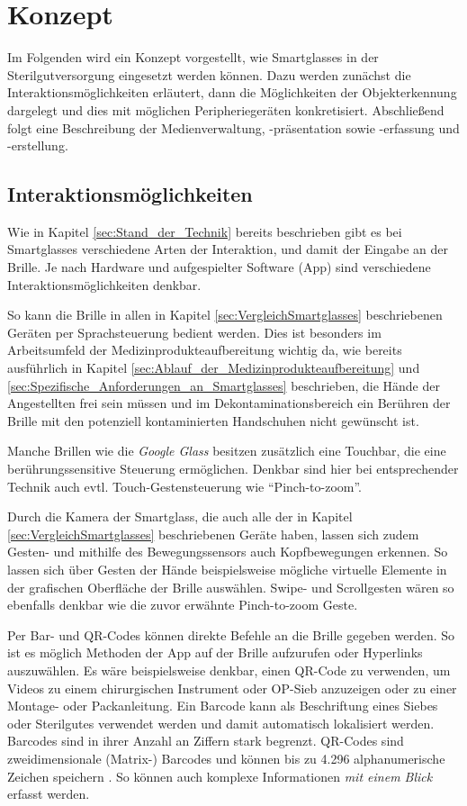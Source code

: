 %
%
%
%
%
%
\chapter{Konzept}
\label{ch:Konzept}
Im Folgenden wird ein Konzept vorgestellt, wie Smartglasses in der Sterilgutversorgung eingesetzt werden können. Dazu werden zunächst die Interaktionsmöglichkeiten erläutert, dann die Möglichkeiten der Objekterkennung dargelegt und dies mit möglichen Peripheriegeräten konkretisiert. Abschließend folgt eine Beschreibung der Medienverwaltung, -präsentation sowie -erfassung und -erstellung.
%
%
%
%
%
%
\section{Interaktionsmöglichkeiten}
\label{sec:Interaktionsmoeglichkeiten}
Wie in Kapitel \ref{sec:Stand_der_Technik} bereits beschrieben gibt es bei Smartglasses verschiedene Arten der Interaktion, und damit der Eingabe an der Brille. Je nach Hardware und aufgespielter Software (App) sind verschiedene Interaktionsmöglichkeiten denkbar. 

So kann die Brille in allen in Kapitel \ref{sec:VergleichSmartglasses} beschriebenen Geräten per Sprachsteuerung bedient werden. Dies ist besonders im Arbeitsumfeld der Medizinprodukteaufbereitung wichtig da, wie bereits ausführlich in Kapitel \ref{sec:Ablauf_der_Medizinprodukteaufbereitung} und \ref{sec:Spezifische_Anforderungen_an_Smartglasses} beschrieben, die Hände der Angestellten frei sein müssen und im Dekontaminationsbereich ein Berühren der Brille mit den potenziell kontaminierten Handschuhen nicht gewünscht ist.

Manche Brillen wie die \emph{Google Glass} besitzen zusätzlich eine Touchbar, die eine berührungssensitive Steuerung ermöglichen. Denkbar sind hier bei entsprechender Technik auch evtl. Touch-Gestensteuerung wie \enquote{Pinch-to-zoom}.

Durch die Kamera der Smartglass, die auch alle der in Kapitel \ref{sec:VergleichSmartglasses} beschriebenen Geräte haben, lassen sich zudem Gesten- und mithilfe des Bewegungssensors auch Kopfbewegungen erkennen. So lassen sich über Gesten der Hände beispielsweise mögliche virtuelle Elemente in der grafischen Oberfläche der Brille auswählen. Swipe- und Scrollgesten wären so ebenfalls denkbar wie die zuvor erwähnte Pinch-to-zoom Geste.

Per Bar- und QR-Codes können direkte Befehle an die Brille gegeben werden. So ist es möglich Methoden der App auf der Brille aufzurufen oder Hyperlinks auszuwählen. Es wäre beispielsweise denkbar, einen QR-Code zu verwenden, um Videos zu einem chirurgischen Instrument oder OP-Sieb anzuzeigen oder zu einer Montage- oder Packanleitung. Ein Barcode kann als Beschriftung eines Siebes oder Sterilgutes verwendet werden und damit automatisch lokalisiert werden. Barcodes sind in ihrer Anzahl an Ziffern stark begrenzt. QR-Codes sind zweidimensionale (Matrix-) Barcodes und können bis zu 4.296 alphanumerische Zeichen speichern \cite{INCORPORATED2018}. So können auch komplexe Informationen \emph{mit einem Blick} erfasst werden.


